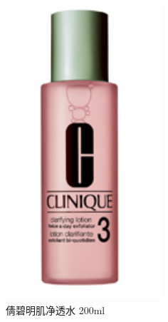 \begin{figure}[htbp]
\begin{minipage}{.5\linewidth}
\centering\includegraphics[width=.9\linewidth]{figures/hua-3.png}
\caption{倩碧明肌净透水 200ml}
\end{minipage}
\end{figure} 

